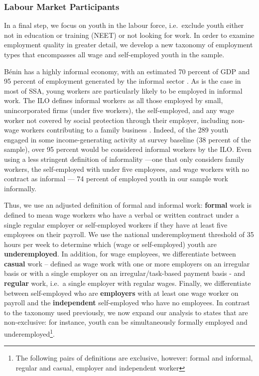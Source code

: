 \documentclass[
  a4paper, twoside, 12pt]{book}
\begin{document}
\hypertarget{labour-market-participants}{%
\subsubsection*{Labour Market Participants}\label{labour-market-participants}}

In a final step, we focus on youth in the labour force, i.e.~exclude youth either not in education or training (NEET) or not looking for work. In order to examine employment quality in greater detail, we develop a new taxonomy of employment types that encompasses all wage and self-employed youth in the sample.

Bénin has a highly informal economy, with an estimated 70 percent of GDP and 95 percent of employment generated by the informal sector \autocite{benhassine2018}. As is the case in most of SSA, young workers are particularly likely to be employed in informal work. The ILO defines informal workers as all those employed by small, unincorporated firms (under five workers), the self-employed, and any wage worker not covered by social protection through their employer, including non-wage workers contributing to a family business \autocite{sumberg2021}. Indeed, of the 289 youth engaged in some income-generating activity at survey baseline (38 percent of the sample), over 95 percent would be considered informal workers by the ILO. Even using a less stringent definition of informality ---one that only considers family workers, the self-employed with under five employees, and wage workers with no contract as informal --- 74 percent of employed youth in our sample work informally.

Thus, we use an adjusted definition of formal and informal work: \textbf{formal} work is defined to mean wage workers who have a verbal or written contract under a single regular employer or self-employed workers if they have at least five employees on their payroll. We use the national underemployment threshold of 35 hours per week to determine which (wage or self-employed) youth are \textbf{underemployed}. In addition, for wage employees, we differentiate between \textbf{casual} work -- defined as wage work with one or more employers on an irregular basis or with a single employer on an irregular/task-based payment basis - and \textbf{regular} work, i.e.~a single employer with regular wages. Finally, we differentiate between self-employed who are \textbf{employers} with at least one wage worker on payroll and the \textbf{independent} self-employed who have no employees. In contrast to the taxonomy used previously, we now expand our analysis to states that are non-exclusive: for instance, youth can be simultaneously formally employed and underemployed\footnote{The following pairs of definitions are exclusive, however: formal and informal, regular and casual, employer and independent worker}.
\end{document}
